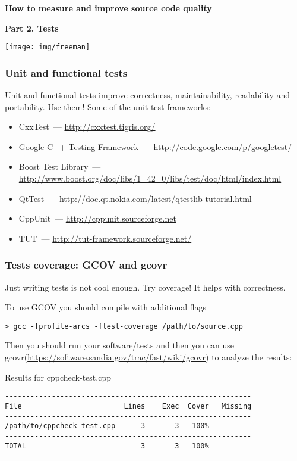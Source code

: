 \documentclass{beamer}
\begin{document}
\begin{frame}
\begin{block}{\begin{center}\Large\textbf{How to measure and improve source code quality}\end{center}}
\begin{center}
\textbf{Part 2. Tests}
\end{center}
\end{block}
\begin{center}
\texttt{[image: img/freeman]}
\end{center}
\end{frame}

\begin{frame}
\frametitle{Unit and functional tests}
Unit and functional tests improve correctness, maintainability, readability and portability. Use them! Some of the unit test frameworks:
\begin{itemize}
\item CxxTest~--- \url{http://cxxtest.tigris.org/}
\item Google C++ Testing Framework~--- \url{http://code.google.com/p/googletest/}
\item Boost Test Library~--- \url{http://www.boost.org/doc/libs/1_42_0/libs/test/doc/html/index.html}
\item QtTest~--- \url{http://doc.qt.nokia.com/latest/qtestlib-tutorial.html}
\item CppUnit~--- \url{http://cppunit.sourceforge.net}
\item TUT~--- \url{http://tut-framework.sourceforge.net/}
\end{itemize}
\end{frame}

\begin{frame}[fragile]
\frametitle{Tests coverage: GCOV and gcovr}
Just writing tests is not cool enough. Try coverage! It helps with correctness.
\begin{exampleblock}{To use GCOV you should compile with additional flags}
\begin{Verbatim}[fontsize=\small]
> gcc -fprofile-arcs -ftest-coverage /path/to/source.cpp
\end{Verbatim}
\end{exampleblock}
Then you should run your software/tests and then you can use gcovr(\url{https://software.sandia.gov/trac/fast/wiki/gcovr}) to analyze the results:
\begin{exampleblock}{Results for cppcheck-test.cpp}
\begin{Verbatim}[fontsize=\small]
----------------------------------------------------------
File                        Lines    Exec  Cover   Missing
----------------------------------------------------------
/path/to/cppcheck-test.cpp      3       3   100%
----------------------------------------------------------
TOTAL                           3       3   100%
----------------------------------------------------------
\end{Verbatim}
\end{exampleblock}
\end{frame}
\end{document}
